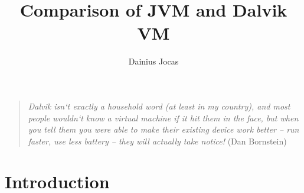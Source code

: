 \documentclass[11pt, oneside]{article}   	%
\title{Comparison of JVM and Dalvik VM}
\author{Dainius Jocas}
\begin{document}
\maketitle
\tableofcontents
\newpage

\begin{quotation}
\textit
{
Dalvik isn`t exactly a household word (at least in my country), and most people wouldn`t know a virtual machine if it hit them in the face, but when you tell them you were able to make their existing device work better -- run faster, use less battery -- they will actually take notice!
} (Dan Bornstein)\cite{website:dalvikjit2010}
\end{quotation}

\section*{Introduction}
\end{document}

